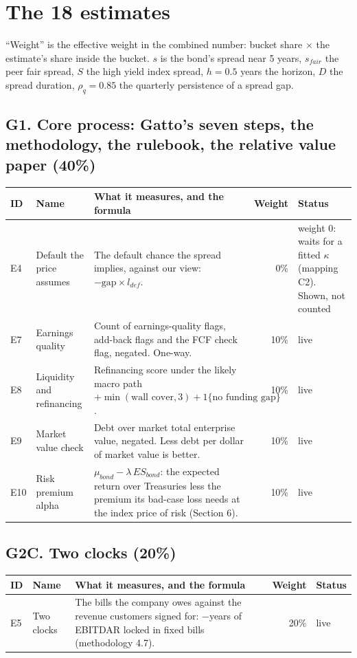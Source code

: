 \documentclass[10pt,a4paper]{article}
\newcommand{\live}{\textcolor{good}{live}}
\newcommand{\off}{\textcolor{bad}{weight 0}}
\begin{document}
\section{The 18 estimates}
``Weight'' is the effective weight in the combined number: bucket share $\times$ the estimate's share inside the bucket. $s$ is the bond's spread near 5 years, $s_{fair}$ the peer fair spread, $S$ the high yield index spread, $h = 0.5$ years the horizon, $D$ the spread duration, $\rho_q = 0.85$ the quarterly persistence of a spread gap.

\subsection*{G1. Core process: Gatto's seven steps, the methodology, the rulebook, the relative value paper (40\%)}
\begin{longtable}{lP{3.2cm}P{6.6cm}rP{2.4cm}}
\toprule
ID & Name & What it measures, and the formula & Weight & Status \\\midrule\endhead
E4 & Default the price assumes & The default chance the spread implies, against our view: $-\text{gap}\times l_{def}$. & 0\% & \off: waits for a fitted $\kappa$ (mapping C2). Shown, not counted \\
E7 & Earnings quality & Count of earnings-quality flags, add-back flags and the FCF check flag, negated. One-way. & 10\% & \live \\
E8 & Liquidity and refinancing & Refinancing score under the likely macro path $+ \min(\text{wall cover}, 3) + 1\{\text{no funding gap}\}$. & 10\% & \live \\
E9 & Market value check & Debt over market total enterprise value, negated. Less debt per dollar of market value is better. & 10\% & \live \\
E10 & Risk premium alpha & $\mu_{bond} - \lambda\,ES_{bond}$: the expected return over Treasuries less the premium its bad-case loss needs at the index price of risk (Section 6). & 10\% & \live \\
\bottomrule
\end{longtable}

\subsection*{G2C. Two clocks (20\%)}
\begin{longtable}{lP{3.2cm}P{6.6cm}rP{2.4cm}}
\toprule
ID & Name & What it measures, and the formula & Weight & Status \\\midrule\endhead
E5 & Two clocks & The bills the company owes against the revenue customers signed for: $-$years of EBITDAR locked in fixed bills (methodology 4.7). & 20\% & \live \\
\bottomrule
\end{longtable}
\end{document}

